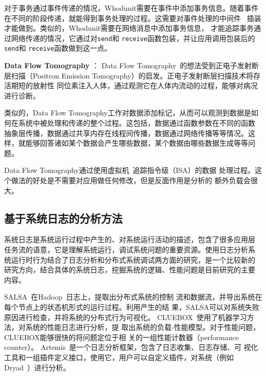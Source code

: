 对于事务通过事件传递的情况，Whodunit需要在事件中添加事务信息。随着事件
在不同的阶段传递，就能得到事务处理的过程。这需要对事件处理的中间件
~\cite{seda}插装才能做到。类似的，Whodunit需要在网络消息中添加事务信息，
才能追踪事务通过网络传递的情况，它通过对\texttt{send}和
\texttt{receive}函数包装，并让应用调用包装后的\texttt{send}和
\texttt{receive}函数做到这一点。

\textbf{Data Flow Tomography} ：
Data Flow Tomography~\cite{dft}的想法受到正电子发射断层扫描（Positron
Emission Tomography）的启发。正电子发射断层扫描技术将存活期短的放射性
同位素注入人体，通过观测它在人体内流动的过程，能够对病况进行诊断。

类似的，Data Flow Tomography工作对数据添加标记，从而可以观测到数据是如
何在系统中被处理和传递的整个过程。这包括，数据通过函数参数在不同的函数
抽象层传播，数据通过共享内存在线程间传播，数据通过网络传播等等情况。这
样，就能够回答诸如某个数据会产生哪些数据，某个数据由哪些数据生成等等问
题。

Data Flow Tomography通过使用虚拟机~\cite{qemu}追踪指令级（ISA）的数据
处理过程。这个做法的好处是不需要对应用做任何修改，但是反面作用是分析的
额外负载会很大。


\subsection{基于系统日志的分析方法}
\label{related:debug:log}


系统日志是系统运行过程中产生的、对系统运行活动的描述，包含了很多应用层
任务流的语意，它是理解系统运行，调试系统问题的重要资源。使用日志分析系
统运行时行为结合了日志分析和分布式系统调试两方面的研究，是一个比较新的
研究方向，结合具体的系统日志，挖掘系统的逻辑、性能问题是目前研究的主要
内容。

SALSA~\cite{salsa}在Hadoop~\cite{hadoop}日志上，提取出分布式系统的控制
流和数据流，并导出系统在每个节点上的状态机形式的运行过程。利用产生的结
果，SALSA可以对系统失败原因进行检查，并将系统的分布式行为可视化。
CLUEBOX~\cite{cluebox}使用了机器学习方法，对系统的性能日志进行分析，提
取出系统的负载-性能模型。对于性能问题，CLUEBOX能够很快的将问题定位于相
关的一组性能计数器（performance counter）。
Artemis~\cite{artemis}是一个日志分析框架，包含了日志收集、日志存储、可
视化工具和一组插件定义接口，使用它，用户可以自定义插件，对系统（例如
Dryad~\cite{dryad}）进行分析。

